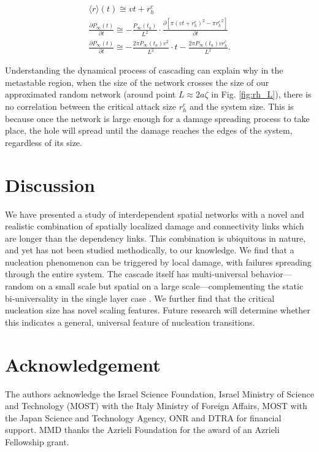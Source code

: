\documentclass[twocolumn,noshowpacs,pre,preprintnumbers,superscriptaddress,amsmath,amssymb,floatfix]{revtex4}
\begin{document}
	\begin{gather}
	\langle r \rangle(t) \cong  vt + r_h^c \\
	\frac{\partial P_\infty(t)}{\partial t} \cong -\frac{P_\infty(t_a)}{L^2} \cdot \frac{\partial {[\pi(vt + r_h^c)^{2}-\pi {r_h^c}^{2}]} }{\partial t} \\
	\frac{\partial P_\infty(t)}{\partial t} \cong - \frac{2 \pi P_\infty(t_a) v^2}{L^2} \cdot t - \frac{2\pi P_\infty(t_a) v r_h^c}{L^2}.
	\label{eq:diff_pinf}
	\end{gather}
	
	Understanding the dynamical process of cascading can explain why in the metastable region, when the size of the network crosses the size of our approximated random network (around point $L\approx2a\zeta$ in Fig. \ref{fig:rh_L}), there is no correlation between the critical attack size $r_h^c$ and the system size.
	This is because once the network is large enough for a damage spreading process to take place, the hole will spread until the damage reaches the edges of the system, regardless of its size.
	
	\section{Discussion}
	We have presented a study of interdependent spatial networks with a novel and realistic combination of spatially localized damage and connectivity links which are longer than the dependency links. 
	This combination is ubiquitous in nature, and yet has not been studied  methodically, to our knowledge.
	We find that a nucleation phenomenon can be triggered by local damage, with failures spreading through the entire system.
	The cascade itself has multi-universal behavior---random on a small scale but spatial on a large scale---complementing the static bi-universality in the single layer case \cite{grossvaknin-JPS}.
	We further find that the critical nucleation size has novel scaling features.
	Future research will determine whether this indicates a general, universal feature of nucleation transitions.
	
	\section*{Acknowledgement}
	The authors acknowledge the Israel Science Foundation, Israel Ministry of Science and Technology (MOST) with the Italy Ministry of Foreign Affairs, MOST with the Japan Science and Technology Agency, ONR and DTRA for financial support. MMD thanks the Azrieli Foundation for the award of an Azrieli Fellowship grant.
	
\end{document}
